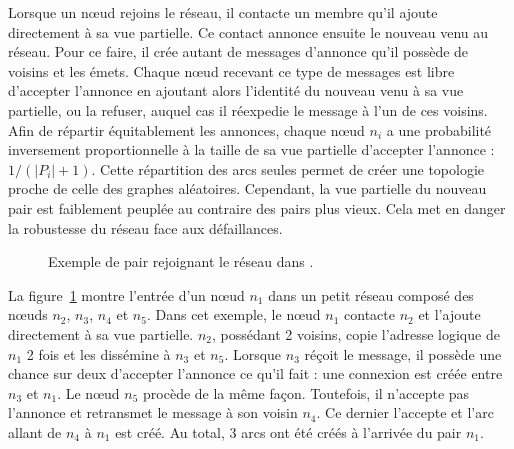 \noindent Lorsque un nœud rejoins le réseau, il contacte un membre qu'il ajoute
directement à sa vue partielle. Ce contact annonce ensuite le nouveau venu au
réseau. Pour ce faire, il crée autant de messages d'annonce qu'il possède de
voisins et les émets. Chaque nœud recevant ce type de messages est libre
d'accepter l'annonce en ajoutant alors l'identité du nouveau venu à sa vue
partielle, ou la refuser, auquel cas il réexpedie le message à l'un de ces
voisins. Afin de répartir équitablement les annonces, chaque nœud $n_i$ a une
probabilité inversement proportionnelle à la taille de sa vue partielle
d'accepter l'annonce : $1/(|P_i|+1)$. Cette répartition des arcs seules permet
de créer une topologie proche de celle des graphes aléatoires. Cependant, la vue
partielle du nouveau pair est faiblement peuplée au contraire des pairs plus
vieux. Cela met en danger la robustesse du réseau face aux défaillances.

\begin{figure}
  \centering
  
  \caption{\label{net:fig:scampexample} Exemple de pair rejoignant le réseau
    dans \SCAMP.}
\end{figure}

\noindent La figure~\ref{net:fig:scampexample} montre l'entrée d'un nœud $n_1$
dans un petit réseau \SCAMP composé des nœuds $n_2$, $n_3$, $n_4$ et $n_5$. Dans
cet exemple, le nœud $n_1$ contacte $n_2$ et l'ajoute directement à sa vue
partielle. $n_2$, possédant 2 voisins, copie l'adresse logique de $n_1$ 2 fois
et les dissémine à $n_3$ et $n_5$. Lorsque $n_3$ réçoit le message, il possède
une chance sur deux d'accepter l'annonce ce qu'il fait : une connexion est créée
entre $n_3$ et $n_1$. Le nœud $n_5$ procède de la même façon. Toutefois, il
n'accepte pas l'annonce et retransmet le message à son voisin $n_4$. Ce dernier
l'accepte et l'arc allant de $n_4$ à $n_1$ est créé. Au total, 3 arcs ont été
créés à l'arrivée du pair $n_1$.



